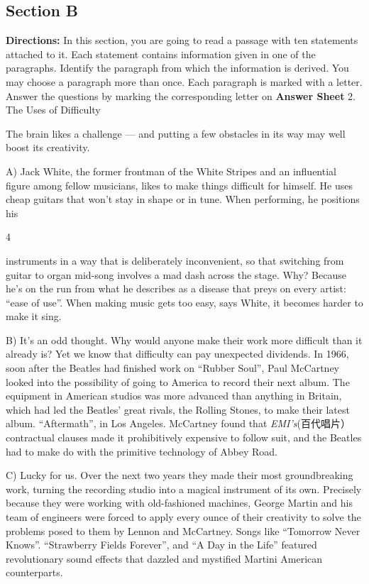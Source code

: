 \documentclass[UTF8,11pt]{ctexart}
\begin{document}
\subsection*{\textbf{Section B}}


\textbf{Directions:} In this section, you are going to read a passage with ten statements attached to it. Each statement contains information given in one of the paragraphs. Identify the paragraph from which the information is derived. You may choose a paragraph more than once. Each paragraph is marked with a letter. Answer the questions by marking the corresponding letter on\textbf{ Answer Sheet} 2. The Uses of Difficulty


The brain likes a challenge — and putting a few obstacles in its way may well boost its creativity.


A) Jack White, the former frontman of the White Stripes and an influential figure among fellow musicians, likes to make things difficult for himself. He uses cheap guitars that won’t stay in shape or in tune. When performing, he positions his


4


instruments in a way that is deliberately inconvenient, so that switching from guitar to organ mid-song involves a mad dash across the stage. Why? Because he’s on the run from what he describes as a disease that preys on every artist: “ease of use”. When making music gets too easy, says White, it becomes harder to make it sing.


B) It’s an odd thought. Why would anyone make their work more difficult than it already is? Yet we know that difficulty can pay unexpected dividends. In 1966, soon after the Beatles had finished work on “Rubber Soul”, Paul McCartney looked into the possibility of going to America to record their next album. The equipment in American studios was more advanced than anything in Britain, which had led the Beatles’ great rivals, the Rolling Stones, to make their latest album. “Aftermath”, in Los Angeles. McCartney found that \textit{EMI’s}(百代唱片）contractual clauses made it prohibitively expensive to follow suit, and the Beatles had to make do with the primitive technology of Abbey Road.


C) Lucky for us. Over the next two years they made their most groundbreaking work, turning the recording studio into a magical instrument of its own. Precisely because they were working with old-fashioned machines, George Martin and his team of engineers were forced to apply every ounce of their creativity to solve the problems posed to them by Lennon and McCartney. Songs like “Tomorrow Never Knows”. “Strawberry Fields Forever”, and “A Day in the Life” featured revolutionary sound effects that dazzled and mystified Martini American counterparts.
\end{document}

